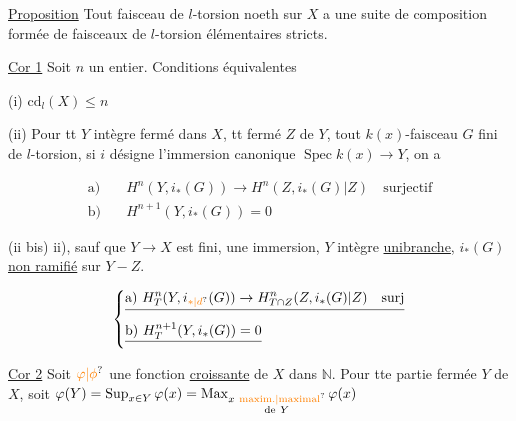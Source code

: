\uline{Proposition} Tout faisceau de $l$-torsion noeth sur $X$ a une suite de composition formée de faisceaux de $l$-torsion élémentaires stricts.

\uline{Cor 1} Soit $n$ un entier. Conditions équivalentes

(i) $\mathrm{cd}_l(X)\leq n$

(ii) Pour tt $Y$ intègre fermé dans $X$,   tt fermé $Z$ de $Y$,  tout $k(x)$-faisceau $G$ fini de $l$-torsion, si $i$ désigne l'immersion canonique $\operatorname{Spec} k(x)\longrightarrow Y$, on a

\[
\begin{aligned}
\text{a)}\quad&H^n(Y,i_*(G))\longrightarrow H^n(Z,i_*(G)|Z)\quad\text{surjectif}\\
\text{b)}\quad&H^{n+1}(Y,i_*(G))=0
\end{aligned}
\]

 (ii bis)  ii), sauf que $Y\longrightarrow X$ est fini,  une immersion, $Y$ intègre \uline{unibranche}, $i_*(G)$ \uline{non ramifié} sur $Y-Z$.


\[
\left\{\begin{aligned}
&\deleted{\text{a)}\ H^n_T(Y,i_{\unsure{*|d}}(G))\to H^n_{T\cap Z}(Z,i_*(G)|Z)\quad\text{surj}}\\
&\deleted{\text{b)}\ H^{n+1}_T(Y,i_*(G))=0}
\end{aligned}\right.
\]


\uline{Cor 2} Soit $\unsure{\varphi|\phi}$ une fonction  \uline{croissante} de  $X$ dans $\mathbb N$.  Pour tte partie fermée $Y$ de $X$, soit $\varphi(Y)=\operatorname*{Sup}_{x\in Y}\varphi(x)=\operatorname*{Max}_{\substack{x\ \text{\unsure{maxim.|maximal}}\\\text{de}\ Y}}\varphi(x)$

